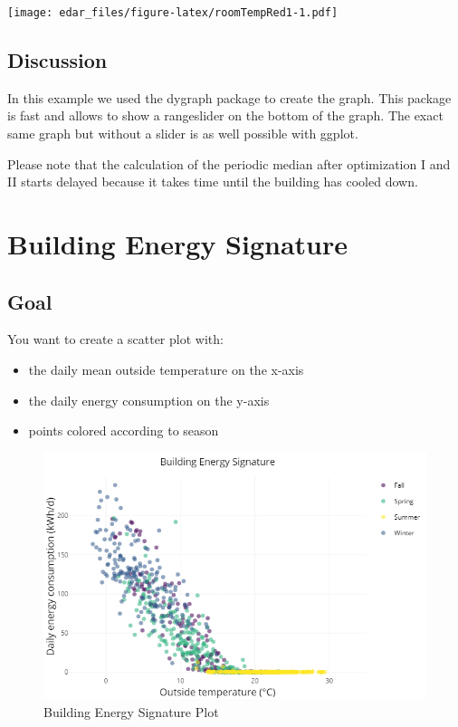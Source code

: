 \documentclass[
  a4paperpaper,
]{book}
\begin{document}
\texttt{[image: edar\_files/figure-latex/roomTempRed1-1.pdf]}

\hypertarget{discussion-7}{%
\subsection{Discussion}\label{discussion-7}}

In this example we used the dygraph package to create the graph. This package is fast and allows to show a rangeslider on the bottom of the graph. The exact same graph but without a slider is as well possible with ggplot.

Please note that the calculation of the periodic median after optimization I and II starts delayed because it takes time until the building has cooled down.

\newpage

\hypertarget{building-energy-signature}{%
\section{Building Energy Signature}\label{building-energy-signature}}

\hypertarget{goal-18}{%
\subsection{Goal}\label{goal-18}}

You want to create a scatter plot with:

\begin{itemize}
\item
  the daily mean outside temperature on the x-axis
\item
  the daily energy consumption on the y-axis
\item
  points colored according to season
\end{itemize}

\begin{figure}
\includegraphics[width=0.7\linewidth]{images/plotBldgEngySigScatter} \caption{Building Energy Signature Plot}\label{fig:unnamed-chunk-27}
\end{figure}
\end{document}
